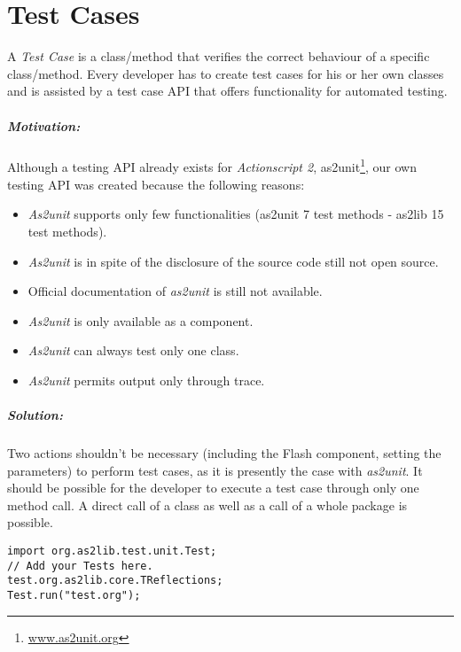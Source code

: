 \chapter{Test Cases}
\label{sec:TestCases}

A \emph{Test Case} is a class/method that verifies the correct behaviour of a specific class/method. Every developer has to create test cases for his or her own classes and is assisted by a test case API that offers functionality for automated testing.

\paragraph{Motivation:}
Although a testing API already exists for {\sl Actionscript 2}, as2unit\footnote{\href{http://www.as2unit.org}{www.as2unit.org}}, our own testing API was created because the following reasons:

\begin{itemize}
	\item {\sl As2unit} supports only few functionalities (as2unit 7 test methods - as2lib 15 test methods).
	\item {\sl As2unit} is in spite of the disclosure of the source code still not open source.
	\item Official documentation of {\sl as2unit} is still not available.
	\item {\sl As2unit} is only available as a component.
	\item {\sl As2unit} can always test only one class.
	\item {\sl As2unit} permits output only through trace.
\end{itemize}

\paragraph{Solution:}

Two actions shouldn't be necessary (including the Flash component, setting the parameters) to perform test cases, as it is presently the case with {\sl as2unit}. It should be possible for the developer to execute a test case through only one method call. A direct call of a class as well as a call of a whole package is possible. 
\clearpage
\begin{lstlisting}[frame=single]
import org.as2lib.test.unit.Test;
// Add your Tests here.
test.org.as2lib.core.TReflections;
Test.run("test.org");
\end{lstlisting}

